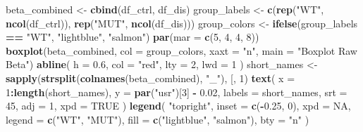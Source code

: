 \documentclass[
]{article}
\newenvironment{Shaded}{\begin{snugshade}}{\end{snugshade}}
\newcommand{\AttributeTok}[1]{\textcolor[rgb]{0.13,0.29,0.53}{#1}}
\newcommand{\ConstantTok}[1]{\textcolor[rgb]{0.56,0.35,0.01}{#1}}
\newcommand{\DecValTok}[1]{\textcolor[rgb]{0.00,0.00,0.81}{#1}}
\newcommand{\FloatTok}[1]{\textcolor[rgb]{0.00,0.00,0.81}{#1}}
\newcommand{\FunctionTok}[1]{\textcolor[rgb]{0.13,0.29,0.53}{\textbf{#1}}}
\newcommand{\NormalTok}[1]{#1}
\newcommand{\OtherTok}[1]{\textcolor[rgb]{0.56,0.35,0.01}{#1}}
\newcommand{\SpecialCharTok}[1]{\textcolor[rgb]{0.81,0.36,0.00}{\textbf{#1}}}
\newcommand{\StringTok}[1]{\textcolor[rgb]{0.31,0.60,0.02}{#1}}
\begin{document}
\begin{Shaded}
\begin{Highlighting}[]
\NormalTok{beta\_combined }\OtherTok{\textless{}{-}} \FunctionTok{cbind}\NormalTok{(df\_ctrl, df\_dis)}
\NormalTok{group\_labels }\OtherTok{\textless{}{-}} \FunctionTok{c}\NormalTok{(}\FunctionTok{rep}\NormalTok{(}\StringTok{"WT"}\NormalTok{, }\FunctionTok{ncol}\NormalTok{(df\_ctrl)), }\FunctionTok{rep}\NormalTok{(}\StringTok{"MUT"}\NormalTok{, }\FunctionTok{ncol}\NormalTok{(df\_dis)))}
\NormalTok{group\_colors }\OtherTok{\textless{}{-}} \FunctionTok{ifelse}\NormalTok{(group\_labels }\SpecialCharTok{==} \StringTok{"WT"}\NormalTok{, }\StringTok{"lightblue"}\NormalTok{, }\StringTok{"salmon"}\NormalTok{)}
\FunctionTok{par}\NormalTok{(}\AttributeTok{mar =} \FunctionTok{c}\NormalTok{(}\DecValTok{5}\NormalTok{, }\DecValTok{4}\NormalTok{, }\DecValTok{4}\NormalTok{, }\DecValTok{8}\NormalTok{))}
\FunctionTok{boxplot}\NormalTok{(beta\_combined,}
        \AttributeTok{col =}\NormalTok{ group\_colors,}
        \AttributeTok{xaxt =} \StringTok{"n"}\NormalTok{,}
        \AttributeTok{main =} \StringTok{"Boxplot Raw Beta"}\NormalTok{)}
\FunctionTok{abline}\NormalTok{(}
  \AttributeTok{h =} \FloatTok{0.6}\NormalTok{,}
  \AttributeTok{col =} \StringTok{"red"}\NormalTok{,}
  \AttributeTok{lty =} \DecValTok{2}\NormalTok{,}
  \AttributeTok{lwd =} \DecValTok{1}
\NormalTok{)}
\NormalTok{short\_names }\OtherTok{\textless{}{-}} \FunctionTok{sapply}\NormalTok{(}\FunctionTok{strsplit}\NormalTok{(}\FunctionTok{colnames}\NormalTok{(beta\_combined), }\StringTok{"\_"}\NormalTok{), }\StringTok{\textasciigrave{}}\AttributeTok{[}\StringTok{\textasciigrave{}}\NormalTok{, }\DecValTok{1}\NormalTok{)}
\FunctionTok{text}\NormalTok{(}
  \AttributeTok{x =} \DecValTok{1}\SpecialCharTok{:}\FunctionTok{length}\NormalTok{(short\_names),}
  \AttributeTok{y =} \FunctionTok{par}\NormalTok{(}\StringTok{"usr"}\NormalTok{)[}\DecValTok{3}\NormalTok{] }\SpecialCharTok{{-}} \FloatTok{0.02}\NormalTok{,}
  \AttributeTok{labels =}\NormalTok{ short\_names,}
  \AttributeTok{srt =} \DecValTok{45}\NormalTok{,}
  \AttributeTok{adj =} \DecValTok{1}\NormalTok{,}
  \AttributeTok{xpd =} \ConstantTok{TRUE}
\NormalTok{)}
\FunctionTok{legend}\NormalTok{(}
  \StringTok{"topright"}\NormalTok{,}
  \AttributeTok{inset =} \FunctionTok{c}\NormalTok{(}\SpecialCharTok{{-}}\FloatTok{0.25}\NormalTok{, }\DecValTok{0}\NormalTok{),}
  \AttributeTok{xpd =} \ConstantTok{NA}\NormalTok{,}
  \AttributeTok{legend =} \FunctionTok{c}\NormalTok{(}\StringTok{"WT"}\NormalTok{, }\StringTok{"MUT"}\NormalTok{),}
  \AttributeTok{fill =} \FunctionTok{c}\NormalTok{(}\StringTok{"lightblue"}\NormalTok{, }\StringTok{"salmon"}\NormalTok{),}
  \AttributeTok{bty =} \StringTok{"n"}
\NormalTok{)}
\end{Highlighting}
\end{Shaded}
\end{document}
